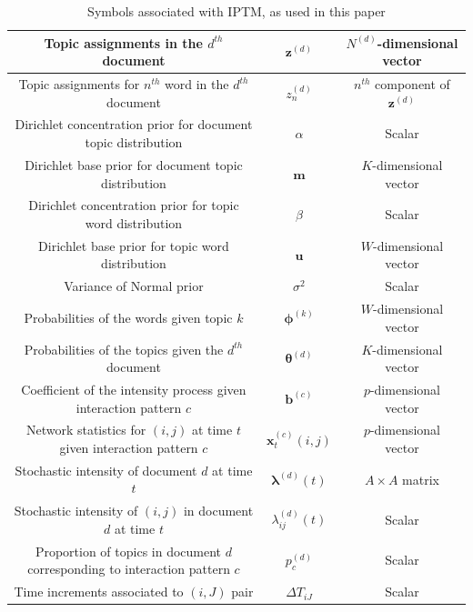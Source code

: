 \documentclass[a4paper]{article}
\begin{document}
\begin{table}[ht]
{\begin{tabular}{ |c|c|c|}
  			Topic assignments in the $d^{th}$ document&$\boldsymbol{z}^{(d)}$ & $N^{(d)}$-dimensional vector\\
  			\hline 
  			Topic assignments for $n^{th}$ word in the $d^{th}$ document&${z}_n^{(d)}$ & $n^{th}$ component of $\boldsymbol{z}^{(d)}$\\
  			\hline 	
  			Dirichlet concentration prior for document topic distribution&$\alpha$ & Scalar \\
  			\hline	
  			Dirichlet base prior for document topic distribution&$\boldsymbol{m}$ & $K$-dimensional vector \\
  			\hline			
  			Dirichlet concentration prior for topic word distribution&$\beta$ & Scalar \\
  			\hline			 
  			Dirichlet base prior for topic word distribution&$\boldsymbol{u}$ & $W$-dimensional vector  \\
  			\hline				 	
  			Variance of Normal prior&$\sigma^2$ & Scalar \\
  			\hline		
  			Probabilities of the words given topic $k$ &$\boldsymbol{\phi}^{(k)}$ & $W$-dimensional vector\\
  			\hline
  			Probabilities of the topics given the $d^{th}$ document &$\boldsymbol{\theta}^{(d)}$ & $K$-dimensional vector\\
  			\hline		
  			Coefficient of the intensity process given interaction pattern $c$ &$\boldsymbol{b}^{(c)}$ & $p$-dimensional vector\\
  			\hline		
  			Network statistics for $(i, j)$ at time $t$ given interaction pattern $c$ &$\boldsymbol{x}^{(c)}_t{(i,j)}$ & $p$-dimensional vector\\
  			\hline		
  			Stochastic intensity of document $d$ at time $t$ & $\boldsymbol{\lambda}^{(d)}(t)$ & $A\times A$ matrix\\
  			\hline
  		  	Stochastic intensity of $(i, j)$ in document $d$ at time $t$ & ${\lambda}_{ij}^{(d)}(t)$ & Scalar\\
  		  	\hline	
  		  	  		  	Proportion of topics in document $d$ corresponding to interaction pattern $c$ & $p_c^{(d)}$ & Scalar\\
  		  	  		  	\hline
  		  Time increments associated to $(i, J)$ pair & $\Delta T_{iJ}$ & Scalar\\
  		  		\hline
  			\hline
  		\end{tabular}}
  		\caption {Symbols associated with IPTM, as used in this paper}
  		\label{table:SymbolsIPTM}
  	\end{table}
  	\normalsize
\end{document}
